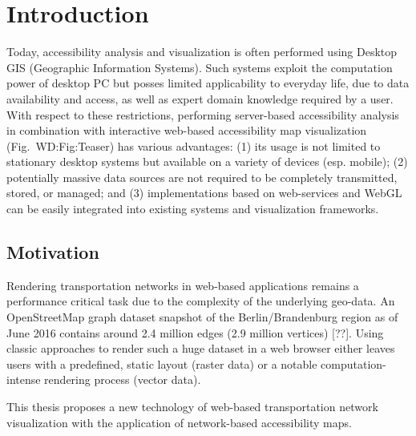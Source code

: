 
\cleardoublepage              %
\chapter{Introduction}
  Today, accessibility analysis and visualization is often performed using Desktop GIS (Geographic Information Systems). Such systems exploit the computation power of desktop PC but posses limited applicability to everyday life, due to data availability and access, as well as expert domain knowledge required by a user. With respect to these restrictions, performing server-based accessibility analysis in combination with interactive web-based accessibility map visualization (Fig.~{WD:Fig:Teaser}) has various advantages: (1) its usage is not limited to stationary desktop systems but available on a variety of devices (esp. mobile); (2) potentially massive data sources are not required to be completely transmitted, stored, or managed; and (3) implementations based on web-services and WebGL \cite{Jackson2016} can be easily integrated into existing systems and visualization frameworks.\par
  \section{Motivation}
    Rendering transportation networks in web-based applications remains a performance critical task due to the complexity of the underlying geo-data. An OpenStreetMap graph dataset snapshot of the Berlin/Brandenburg region as of June 2016 contains around 2.4 million edges (2.9 million vertices) [??]. Using classic approaches to render such a huge dataset in a web browser either leaves users with a predefined, static layout (raster data) or a notable computation-intense rendering process (vector data).\par
    This thesis proposes a new technology of web-based transportation network visualization with the application of network-based accessibility maps.\par
